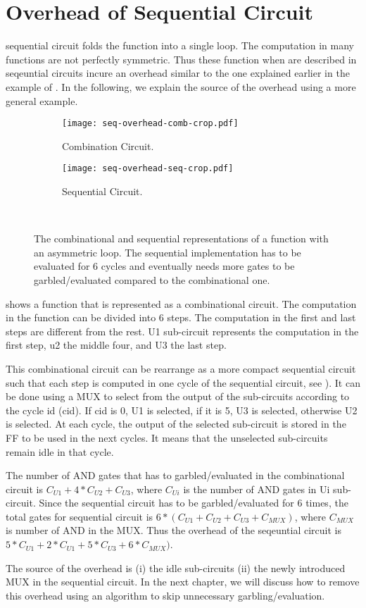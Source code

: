 \section{Overhead of Sequential Circuit}
sequential circuit folds the function into a single loop.
The computation in many functions are not perfectly symmetric.
Thus these function when are described in seqeuntial circuits incure an overhead similar to the one explained earlier in the example of .
In the following, we explain the source of the overhead using a more general example.

\begin{figure}[ht]
    \centering
    \begin{subfigure}[t]{0.8\textwidth}
        \texttt{[image: seq-overhead-comb-crop.pdf]}
        \caption{Combination Circuit.}\label{fig:seq-overhead-comb}
    \end{subfigure}
    \begin{subfigure}[t]{0.7\textwidth}
        \texttt{[image: seq-overhead-seq-crop.pdf]}
        \caption{Sequential Circuit.}\label{fig:seq-overhead-seq}
    \end{subfigure}\\
    \caption{The combinational and sequential representations of a function with an asymmetric loop.
    The sequential implementation has to be evaluated for 6 cycles and eventually needs more gates to be garbled/evaluated compared to the combinational one.}\label{fig:fig:seq-overhead-comb}
\end{figure}

 shows a function that is represented as a combinational circuit.
The computation in the function can be divided into 6 steps.
The computation in the first and last steps are different from the rest.
U1 sub-circuit represents the computation in the first step, u2 the middle four, and U3 the last step.

This combinational circuit can be rearrange as a more compact sequential circuit such that each step is computed in one cycle of the sequential circuit, see ).
It can be done using a MUX to select from the output of the sub-circuits according to the cycle id (cid).
If cid is 0, U1 is selected, if it is 5, U3 is selected, otherwise U2 is selected.
At each cycle, the output of the selected sub-circuit is stored in the FF to be used in the next cycles.
It means that the unselected sub-circuits remain idle in that cycle.

The number of AND gates that has to garbled/evaluated in the combinational circuit is $C_{U1}+4*C_{U2}+C_{U3}$, where $C_{Ui}$ is the number of AND gates in Ui sub-circuit.
Since the sequential circuit has to be garbled/evaluated for 6 times, the total gates for sequential circuit is $6*(C_{U1}+C_{U2}+C_{U3}+C_{MUX})$, where $C_{MUX}$ is number of AND in the MUX.
Thus the overhead of the seqeuntial circuit is $5*C_{U1}+2*C_{U1}+5*C_{U3}+6*C_{MUX})$.

The source of the overhead is (i) the idle sub-circuits (ii) the newly introduced MUX in the sequential circuit.
In the next chapter, we will discuss how to remove this overhead using an algorithm to skip unnecessary garbling/evaluation.
